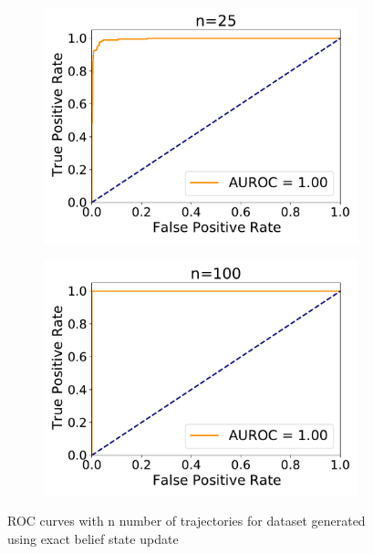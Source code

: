 \begin{figure}[htb]
\begin{subfigure}{.33\textwidth}
		\includegraphics[width=1\linewidth]{figures/roc_exactUpdate/AUROC_2000samples_class0_llh_n25}
		\caption{}
		\label{fig:roc_exact_n25}
	\end{subfigure}
	\begin{subfigure}{.33\textwidth}
		\centering
		\includegraphics[width=1\linewidth]{figures/roc_exactUpdate/AUROC_2000samples_class0_llh_n100}
		\caption{}
		\label{fig:roc_exact_n100}
	\end{subfigure}
	\caption{ROC curves with n number of trajectories for dataset generated using exact belief state update}
	\label{fig:roc_exact}
\end{figure}

